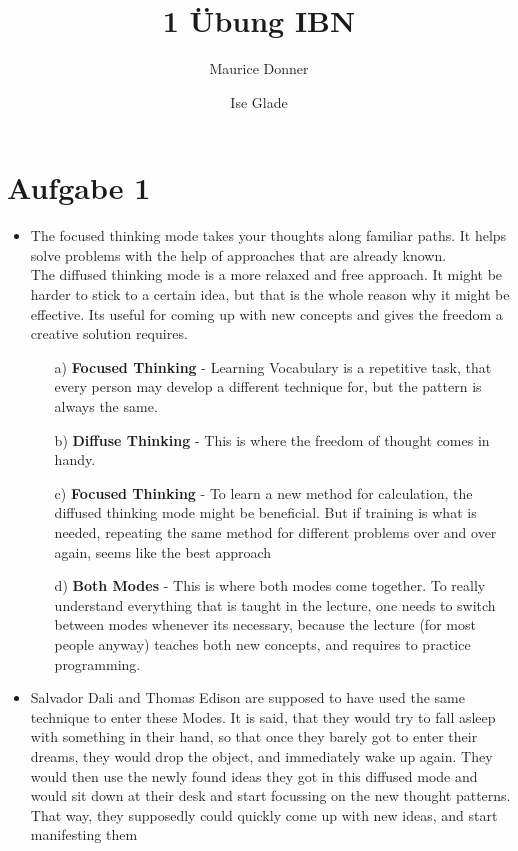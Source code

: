 \documentclass{article}
\title{\textsf{\color{blue!40!black}1 Übung IBN}}
\author{Maurice Donner \and Ise Glade}
\begin{document}
\maketitle

\section*{Aufgabe 1}
\begin{itemize}
\item 
The focused thinking mode takes your thoughts along familiar paths. It helps
solve problems with the help of approaches that are already known.\\
The diffused thinking mode is a more relaxed and free approach. It might be
harder to stick to a certain idea, but that is the whole reason why it might be
effective. Its useful for coming up with new concepts and gives the freedom
a creative solution requires.
\begin{itemize}
    \item[a)] \textbf{Focused Thinking} - Learning Vocabulary is a repetitive
	task, that every person may develop a different technique for, but the
	pattern is always the same.
    \item[b)] \textbf{Diffuse Thinking} - This is where the freedom of thought
	comes in handy. 
    \item[c)] \textbf{Focused Thinking} - To learn a new method
	for calculation, the diffused thinking mode might be beneficial. But
	if training is what is needed, repeating the same method for different
	problems over and over again, seems like the best approach
    \item[d)] \textbf{Both Modes} - This is where both modes come together.
	To really understand everything that is taught in the lecture, one
	needs to switch between modes whenever its necessary, because the lecture
	(for most people anyway) teaches both new concepts, and requires to
	practice programming.
\end{itemize}
\item Salvador Dali and Thomas Edison are supposed to have used the same technique
to enter these Modes. It is said, that they would try to fall asleep with
something in their hand, so that once they barely got to enter their dreams,
they would drop the object, and immediately wake up again. They would then use
the newly found ideas they got in this diffused mode and would sit down at their
desk and start focussing on the new thought patterns. That way, they 
supposedly could quickly come up with new ideas, and start manifesting them

\end{itemize}
\end{document}

